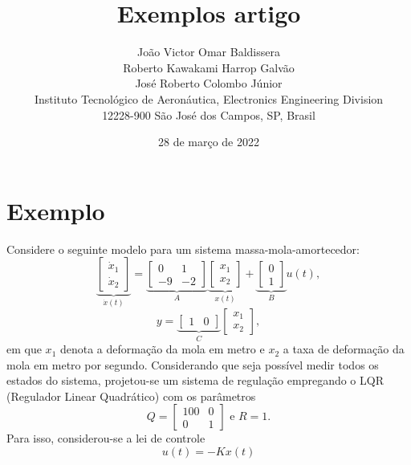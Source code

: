\documentclass{article}
\title{Exemplos artigo}
\author{João Victor Omar Baldissera \\ Roberto Kawakami Harrop Galvão \\ José Roberto Colombo Júnior \\ Instituto Tecnológico de Aeronáutica, Electronics Engineering Division \\ 12228-900 São José dos Campos, SP, Brasil}
\date{28 de março de 2022}
\begin{document}

\section*{Exemplo}

\noindent
Considere o seguinte modelo para um sistema massa-mola-amortecedor:
\begin{equation*}
    \underbrace{\left[ \begin{matrix} \dot{x}_{1} \\ \dot{x}_{2} \end{matrix} \right]}_{\dot{x}(t)} = \underbrace{\left[ \begin{matrix} 0 & 1 \\ -9 & -2 \end{matrix} \right]}_{A} \underbrace{\left[ \begin{matrix} x_{1} \\ x_{2} \end{matrix} \right]}_{x(t)} + \underbrace{\left[ \begin{matrix} 0 \\ 1 \end{matrix} \right]}_{B} u(t),
\end{equation*}
\begin{equation*}
    y = \underbrace{\left[ \begin{matrix}1 & 0 \end{matrix} \right]}_{C} \left[ \begin{matrix} x_{1} \\ x_{2} \end{matrix} \right],
\end{equation*}
em que $x_{1}$ denota a deformação da mola em metro e $x_{2}$ a taxa de deformação da mola em metro por segundo. Considerando que seja possível medir todos os estados do sistema, projetou-se um sistema de regulação empregando o LQR (Regulador Linear Quadrático) com os parâmetros
\begin{equation*}
    Q = \left[ \begin{matrix} 100 & 0 \\ 0 & 1 \end{matrix} \right] \text{ e } R = 1.
\end{equation*}
Para isso, considerou-se a lei de controle
\begin{equation*}
    u(t) = -Kx(t)
\end{equation*}
\end{document}
